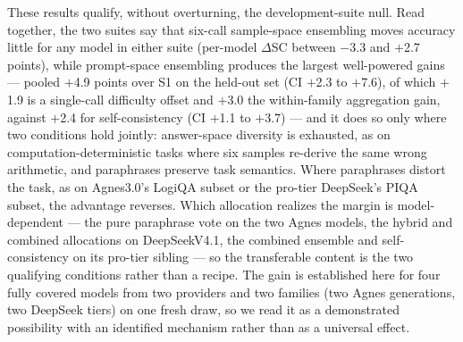 These results qualify, without overturning, the development-suite null. Read together, the two suites say that six-call sample-space ensembling moves accuracy little for any model in either suite (per-model $\Delta$SC between $-$3.3 and $+$2.7 points), while prompt-space ensembling produces the largest well-powered gains --- pooled $+$4.9 points over S1 on the held-out set (CI $+$2.3 to $+$7.6), of which $+$1.9 is a single-call difficulty offset and $+$3.0 the within-family aggregation gain, against $+$2.4 for self-consistency (CI $+$1.1 to $+$3.7) --- and it does so only where two conditions hold jointly: answer-space diversity is exhausted, as on computation-deterministic tasks where six samples re-derive the same wrong arithmetic, and paraphrases preserve task semantics. Where paraphrases distort the task, as on Agnes3.0's LogiQA subset or the pro-tier DeepSeek's PIQA subset, the advantage reverses. Which allocation realizes the margin is model-dependent --- the pure paraphrase vote on the two Agnes models, the hybrid and combined allocations on DeepSeekV4.1, the combined ensemble and self-consistency on its pro-tier sibling --- so the transferable content is the two qualifying conditions rather than a recipe. The gain is established here for four fully covered models from two providers and two families (two Agnes generations, two DeepSeek tiers) on one fresh draw, so we read it as a demonstrated possibility with an identified mechanism rather than as a universal effect.
